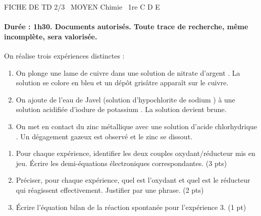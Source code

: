 \documentclass[11pt]{article}
\begin{document}
\begin{tcolorbox}[enhanced,colback=popink,colframe=popink,arc=10pt,boxrule=0pt,left=12pt,right=12pt,top=9pt,bottom=9pt]
{\color{white}\popxbold\small FICHE DE TD 2/3 \textbullet\ MOYEN \hfill Chimie \textbullet\ 1re C D E\par}
\end{tcolorbox}
\vspace{4pt}
\paragraph{Durée : 1h30. Documents autorisés. Toute trace de recherche, même incomplète, sera valorisée.}

\begin{exercice}
On réalise trois expériences distinctes :
\begin{enumerate}
    \item On plonge une lame de cuivre dans une solution de nitrate d'argent . La solution se colore en bleu et un dépôt grisâtre apparaît sur le cuivre.
    \item On ajoute de l'eau de Javel (solution d'hypochlorite de sodium ) à une solution acidifiée d'iodure de potassium . La solution devient brune.
    \item On met en contact du zinc métallique avec une solution d'acide chlorhydrique . Un dégagement gazeux est observé et le zinc se dissout.
\end{enumerate}
\begin{enumerate}
    \item Pour chaque expérience, identifier les deux couples oxydant/réducteur mis en jeu. Écrire les demi-équations électroniques correspondantes. (3 pts)
    \item Préciser, pour chaque expérience, quel est l'oxydant et quel est le réducteur qui réagissent effectivement. Justifier par une phrase. (2 pts)
    \item Écrire l'équation bilan de la réaction spontanée pour l'expérience 3. (1 pt)
\end{enumerate}
\end{exercice}
\end{document}
